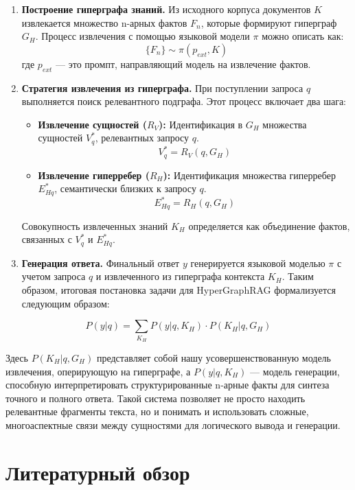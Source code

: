 \documentclass{article}
\begin{document}
\begin{enumerate}
    \item \textbf{Построение гиперграфа знаний.} Из исходного корпуса документов $K$ извлекается множество n-арных фактов $F_n$, которые формируют гиперграф $G_H$. Процесс извлечения с помощью языковой модели $\pi$ можно описать как:
    \[ \{F_n\} \sim \pi(p_{ext}, K) \]
    где $p_{ext}$ — это промпт, направляющий модель на извлечение фактов.

    \item \textbf{Стратегия извлечения из гиперграфа.} При поступлении запроса $q$ выполняется поиск релевантного подграфа. Этот процесс включает два шага:
    \begin{itemize}
        \item \textbf{Извлечение сущностей ($R_V$):} Идентификация в $G_H$ множества сущностей $V_q^*$, релевантных запросу $q$.
        \[ V_q^* = R_V(q, G_H) \]
        \item \textbf{Извлечение гиперребер ($R_H$):} Идентификация множества гиперребер $E_{Hq}^*$, семантически близких к запросу $q$.
        \[ E_{Hq}^* = R_H(q, G_H) \]
    \end{itemize}
    Совокупность извлеченных знаний $K_H$ определяется как объединение фактов, связанных с $V_q^*$ и $E_{Hq}^*$.

    \item \textbf{Генерация ответа.} Финальный ответ $y$ генерируется языковой моделью $\pi$ с учетом запроса $q$ и извлеченного из гиперграфа контекста $K_H$. Таким образом, итоговая постановка задачи для HyperGraphRAG формализуется следующим образом:
\end{enumerate}

\begin{equation}
P(y|q) = \sum_{K_H} P(y|q, K_H) \cdot P(K_H|q, G_H)
\label{eq:rag_hypergraph}
\end{equation}

Здесь $P(K_H|q, G_H)$ представляет собой нашу усовершенствованную модель извлечения, оперирующую на гиперграфе, а $P(y|q, K_H)$ — модель генерации, способную интерпретировать структурированные n-арные факты для синтеза точного и полного ответа. Такой система позволяет не просто находить релевантные фрагменты текста, но и понимать и использовать сложные, многоаспектные связи между сущностями для логического вывода и генерации.

\section{Литературный обзор}
\end{document}
